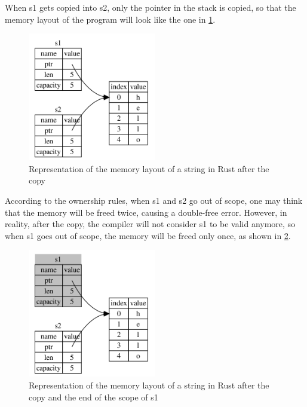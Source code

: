 When s1 gets copied into s2, only the pointer in the stack is copied, so that the memory layout of the program will look like the one in \cref{fig:string-memory-rep2}.

\begin{figure}[h]
    \centering
    \includegraphics[width=0.5\textwidth]{figures/string-memory-rep-2.png}
    \caption{Representation of the memory layout of a string in Rust after the copy}
    \label{fig:string-memory-rep2}
\end{figure}

According to the ownership rules, when s1 and s2 go out of scope, one may think that the memory will be freed twice, causing a double-free error. However, in reality, after the copy, the compiler
will not consider s1 to be valid anymore, so when s1 goes out of scope, the memory will be freed only once, as shown in \cref{fig:string-memory-rep3}.

\begin{figure}[h]
    \centering
    \includegraphics[width=0.5\textwidth]{figures/string-memory-rep-3.png}
    \caption{Representation of the memory layout of a string in Rust after the copy and the end of the scope of s1}
    \label{fig:string-memory-rep3}
\end{figure}


